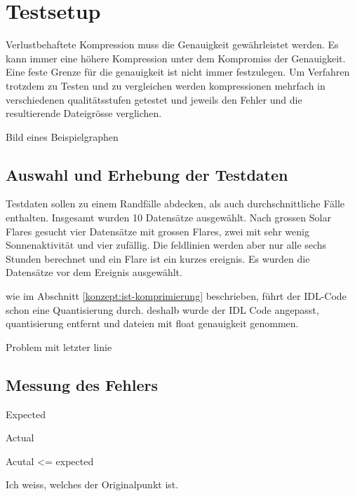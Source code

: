 \section{Testsetup}
Verlustbehaftete Kompression muss die Genauigkeit gewährleistet werden.
Es kann immer eine höhere Kompression unter dem Kompromiss der Genauigkeit.
Eine feste Grenze für die genauigkeit ist nicht immer festzulegen.
Um Verfahren trotzdem zu Testen und zu vergleichen werden kompressionen mehrfach in verschiedenen qualitätsstufen getestet und jeweils den Fehler und die resultierende Dateigrösse verglichen.

Bild eines Beispielgraphen

\subsection{Auswahl und Erhebung der Testdaten}
Testdaten sollen zu einem Randfälle abdecken, als auch durchschnittliche Fälle enthalten.
Insgesamt wurden 10 Datensätze ausgewählt. Nach grossen Solar Flares gesucht vier Datensätze mit grossen Flares, zwei mit sehr wenig Sonnenaktivität und vier zufällig.
Die feldlinien werden aber nur alle sechs Stunden berechnet und ein Flare ist ein kurzes ereignis. Es wurden die Datensätze vor dem Ereignis ausgewählt.

wie im Abschnitt \ref{konzept:ist-komprimierung} beschrieben, führt der IDL-Code schon eine Quantisierung durch. deshalb wurde der IDL Code angepasst, quantisierung entfernt und dateien mit float genauigkeit genommen.  

Problem mit letzter linie

\subsection{Messung des Fehlers}
Expected

Actual

Acutal <= expected

Ich weiss, welches der Originalpunkt ist.
